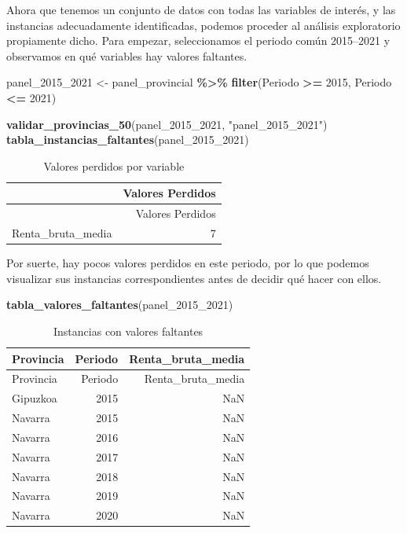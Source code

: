 \documentclass[,article,submit,moreauthors,pdftex]{Definitions/mdpi}
\newenvironment{Shaded}{\begin{snugshade}}{\end{snugshade}}
\newcommand{\DecValTok}[1]{\textcolor[rgb]{0.00,0.00,0.81}{#1}}
\newcommand{\FunctionTok}[1]{\textcolor[rgb]{0.13,0.29,0.53}{\textbf{#1}}}
\newcommand{\NormalTok}[1]{#1}
\newcommand{\OtherTok}[1]{\textcolor[rgb]{0.56,0.35,0.01}{#1}}
\newcommand{\SpecialCharTok}[1]{\textcolor[rgb]{0.81,0.36,0.00}{\textbf{#1}}}
\newcommand{\StringTok}[1]{\textcolor[rgb]{0.31,0.60,0.02}{#1}}
\begin{document}
Ahora que tenemos un conjunto de datos con todas las variables de
interés, y las instancias adecuadamente identificadas, podemos proceder
al análisis exploratorio propiamente dicho. Para empezar, seleccionamos
el periodo común 2015--2021 y observamos en qué variables hay valores
faltantes.

\begin{Shaded}
\begin{Highlighting}[]
\NormalTok{panel\_2015\_2021 }\OtherTok{\textless{}{-}}\NormalTok{ panel\_provincial }\SpecialCharTok{\%\textgreater{}\%}
  \FunctionTok{filter}\NormalTok{(Periodo }\SpecialCharTok{\textgreater{}=} \DecValTok{2015}\NormalTok{, Periodo }\SpecialCharTok{\textless{}=} \DecValTok{2021}\NormalTok{)}

\FunctionTok{validar\_provincias\_50}\NormalTok{(panel\_2015\_2021, }\StringTok{"panel\_2015\_2021"}\NormalTok{)}
\FunctionTok{tabla\_instancias\_faltantes}\NormalTok{(panel\_2015\_2021)}
\end{Highlighting}
\end{Shaded}

\begin{longtable}[]{@{}lr@{}}
\caption{Valores perdidos por variable}\tabularnewline
\toprule\noalign{}
& Valores Perdidos \\
\midrule\noalign{}
\endfirsthead
\toprule\noalign{}
& Valores Perdidos \\
\midrule\noalign{}
\endhead
\bottomrule\noalign{}
\endlastfoot
Renta\_bruta\_media & 7 \\
\end{longtable}

Por suerte, hay pocos valores perdidos en este periodo, por lo que
podemos visualizar sus instancias correspondientes antes de decidir qué
hacer con ellos.

\begin{Shaded}
\begin{Highlighting}[]
\FunctionTok{tabla\_valores\_faltantes}\NormalTok{(panel\_2015\_2021)}
\end{Highlighting}
\end{Shaded}

\begin{longtable}[]{@{}lrr@{}}
\caption{Instancias con valores faltantes}\tabularnewline
\toprule\noalign{}
Provincia & Periodo & Renta\_bruta\_media \\
\midrule\noalign{}
\endfirsthead
\toprule\noalign{}
Provincia & Periodo & Renta\_bruta\_media \\
\midrule\noalign{}
\endhead
\bottomrule\noalign{}
\endlastfoot
Gipuzkoa & 2015 & NaN \\
Navarra & 2015 & NaN \\
Navarra & 2016 & NaN \\
Navarra & 2017 & NaN \\
Navarra & 2018 & NaN \\
Navarra & 2019 & NaN \\
Navarra & 2020 & NaN \\
\end{longtable}
\end{document}
